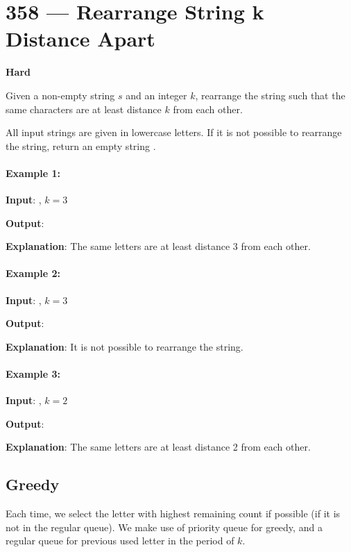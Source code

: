 \section{358 --- Rearrange String k Distance Apart}

\textbf{Hard}

Given a non-empty string $s$ and an integer $k$, rearrange the string such that the same characters are at least distance $k$ from each other.

All input strings are given in lowercase letters. If it is not possible to rearrange the string, return an empty string .

\paragraph{Example 1:}

\begin{flushleft}
\textbf{Input}: , $k = 3$

\textbf{Output}:  

\textbf{Explanation}: The same letters are at least distance 3 from each other.
\end{flushleft}

\paragraph{Example 2:}

\begin{flushleft}
\textbf{Input}: , $k = 3$

\textbf{Output}:  

\textbf{Explanation}: It is not possible to rearrange the string.
\end{flushleft}

\paragraph{Example 3:}

\begin{flushleft}
\textbf{Input}: , $k = 2$

\textbf{Output}: 

\textbf{Explanation}: The same letters are at least distance 2 from each other.
\end{flushleft}


\subsection{Greedy}
Each time, we select the letter with highest remaining count if possible (if it is not in the regular queue). We make use of priority queue for greedy, and a regular queue for previous used letter in the period of $k$.


